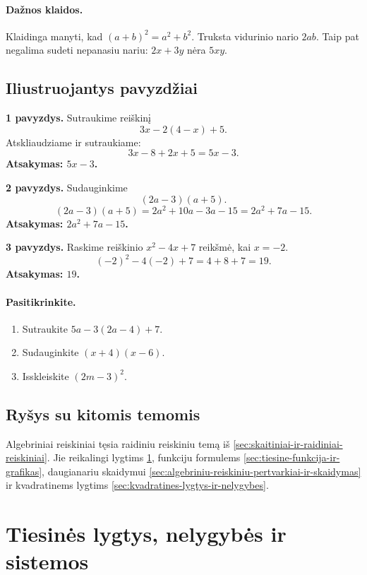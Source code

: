 \paragraph{Dažnos klaidos.}
Klaidinga manyti, kad $(a+b)^2=a^2+b^2$. Truksta vidurinio nario $2ab$. Taip pat negalima sudeti nepanasiu nariu: $2x+3y$ nėra $5xy$.

\subsection{Iliustruojantys pavyzdžiai}
\textbf{1 pavyzdys.} Sutraukime reiškinį
\[
3x-2(4-x)+5.
\]
Atskliaudziame ir sutraukiame:
\[
3x-8+2x+5=5x-3.
\]
\textbf{Atsakymas: $5x-3$.}

\textbf{2 pavyzdys.} Sudauginkime
\[
(2a-3)(a+5).
\]
\[
(2a-3)(a+5)=2a^2+10a-3a-15=2a^2+7a-15.
\]
\textbf{Atsakymas: $2a^2+7a-15$.}

\textbf{3 pavyzdys.} Raskime reiškinio $x^2-4x+7$ reikšmė, kai $x=-2$.
\[
(-2)^2-4(-2)+7=4+8+7=19.
\]
\textbf{Atsakymas: $19$.}

\paragraph{Pasitikrinkite.}
\begin{enumerate}[label=\alph*)]
\item Sutraukite $5a-3(2a-4)+7$.
\item Sudauginkite $(x+4)(x-6)$.
\item Isskleiskite $(2m-3)^2$.
\end{enumerate}

\subsection{Ryšys su kitomis temomis}
Algebriniai reiskiniai tęsia raidiniu reiskiniu temą iš \ref{sec:skaitiniai-ir-raidiniai-reiskiniai}. Jie reikalingi lygtims \ref{sec:tiesines-lygtys-nelygybes-ir-sistemos}, funkciju formulems \ref{sec:tiesine-funkcija-ir-grafikas}, daugianariu skaidymui \ref{sec:algebriniu-reiskiniu-pertvarkiai-ir-skaidymas} ir kvadratinems lygtims \ref{sec:kvadratines-lygtys-ir-nelygybes}.

\section{Tiesinės lygtys, nelygybės ir sistemos}\label{sec:tiesines-lygtys-nelygybes-ir-sistemos}

